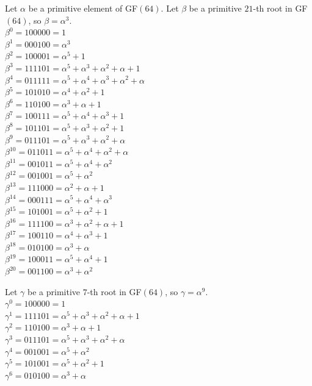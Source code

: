 \noindent Let $\alpha$ be a primitive element of GF$(64)$. 
Let $\beta$ be a primitive $21$-th root in GF$(64)$, 
so $\beta=\alpha^{3}.$ \\
$\beta^{0} = 100000 =  1$\\
$\beta^{1} = 000100 =  \alpha^{3}$\\
$\beta^{2} = 100001 =  \alpha^{5} + 1$\\
$\beta^{3} = 111101 =  \alpha^{5} + \alpha^{3} + \alpha^{2} + \alpha + 1$\\
$\beta^{4} = 011111 =  \alpha^{5} + \alpha^{4} + \alpha^{3} + \alpha^{2} + \alpha$\\
$\beta^{5} = 101010 =  \alpha^{4} + \alpha^{2} + 1$\\
$\beta^{6} = 110100 =  \alpha^{3} + \alpha + 1$\\
$\beta^{7} = 100111 =  \alpha^{5} + \alpha^{4} + \alpha^{3} + 1$\\
$\beta^{8} = 101101 =  \alpha^{5} + \alpha^{3} + \alpha^{2} + 1$\\
$\beta^{9} = 011101 =  \alpha^{5} + \alpha^{3} + \alpha^{2} + \alpha$\\
$\beta^{10} = 011011 =  \alpha^{5} + \alpha^{4} + \alpha^{2} + \alpha$\\
$\beta^{11} = 001011 =  \alpha^{5} + \alpha^{4} + \alpha^{2}$\\
$\beta^{12} = 001001 =  \alpha^{5} + \alpha^{2}$\\
$\beta^{13} = 111000 =  \alpha^{2} + \alpha + 1$\\
$\beta^{14} = 000111 =  \alpha^{5} + \alpha^{4} + \alpha^{3}$\\
$\beta^{15} = 101001 =  \alpha^{5} + \alpha^{2} + 1$\\
$\beta^{16} = 111100 =  \alpha^{3} + \alpha^{2} + \alpha + 1$\\
$\beta^{17} = 100110 =  \alpha^{4} + \alpha^{3} + 1$\\
$\beta^{18} = 010100 =  \alpha^{3} + \alpha$\\
$\beta^{19} = 100011 =  \alpha^{5} + \alpha^{4} + 1$\\
$\beta^{20} = 001100 =  \alpha^{3} + \alpha^{2}$\\
\bigskip

\noindent Let $\gamma$ be a primitive $7$-th root in GF$(64)$, 
so $\gamma=\alpha^{9}.$ \\
$\gamma^{0} = 100000 = 1$\\
$\gamma^{1} = 111101 = \alpha^{5} + \alpha^{3} + \alpha^{2} + \alpha + 1$\\
$\gamma^{2} = 110100 = \alpha^{3} + \alpha + 1$\\
$\gamma^{3} = 011101 = \alpha^{5} + \alpha^{3} + \alpha^{2} + \alpha$\\
$\gamma^{4} = 001001 = \alpha^{5} + \alpha^{2}$\\
$\gamma^{5} = 101001 = \alpha^{5} + \alpha^{2} + 1$\\
$\gamma^{6} = 010100 = \alpha^{3} + \alpha$\\
\bigskip

